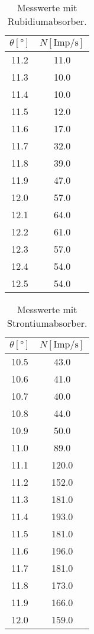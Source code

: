   \begin{table}
    \centering
    \caption{Messwerte mit Rubidiumabsorber.}
    \label{tab:rubidiumtab}
    \begin{tabular}{c c}
      \toprule
      $\theta [°]$ & $N [\text{Imp}/\si{\s}]$ \\
      \midrule
      11.2	& 11.0 \\
      11.3	& 10.0 \\
      11.4	& 10.0 \\
      11.5	& 12.0 \\
      11.6	& 17.0 \\
      11.7	& 32.0 \\
      11.8	& 39.0 \\
      11.9	& 47.0 \\
      12.0	& 57.0 \\
      12.1	& 64.0 \\
      12.2	& 61.0 \\
      12.3	& 57.0 \\
      12.4	& 54.0 \\
      12.5	& 54.0 \\
      \bottomrule
    \end{tabular}
  \end{table}

  \begin{table}
    \centering
    \caption{Messwerte mit Strontiumabsorber.}
    \label{tab:strontiumtab}
    \begin{tabular}{c c}
      \toprule
      $\theta [°]$ & $N [\text{Imp}/\si{\s}]$ \\
      \midrule
      10.5	& 43.0\\
      10.6	& 41.0\\
      10.7	& 40.0\\
      10.8	& 44.0\\
      10.9	& 50.0\\
      11.0	& 89.0\\
      11.1	& 120.0\\
      11.2	& 152.0\\
      11.3	& 181.0\\
      11.4	& 193.0\\
      11.5	& 181.0\\
      11.6	& 196.0\\
      11.7	& 181.0\\
      11.8	& 173.0\\
      11.9	& 166.0\\
      12.0	& 159.0\\
      \bottomrule
    \end{tabular}
  \end{table}

